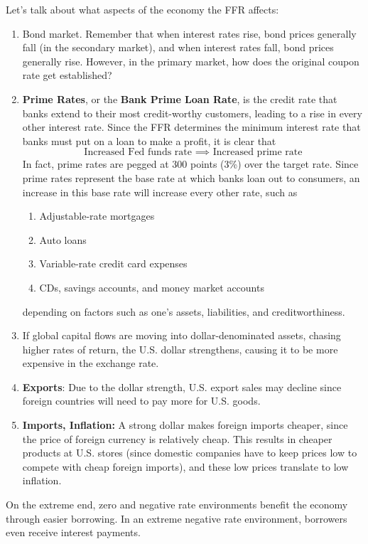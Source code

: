 \documentclass{article}
\begin{document}
      Let's talk about what aspects of the economy the FFR affects: 
      \begin{enumerate}
        \item Bond market. Remember that when interest rates rise, bond prices generally fall (in the secondary market), and when interest rates fall, bond prices generally rise. However, in the primary market, how does the original coupon rate get established? 
        
        \item \textbf{Prime Rates}, or the \textbf{Bank Prime Loan Rate}, is the credit rate that banks extend to their most credit-worthy customers, leading to a rise in every other interest rate. Since the FFR determines the minimum interest rate that banks must put on a loan to make a profit, it is clear that 
        \[\text{Increased Fed funds rate } \implies \text{ Increased prime rate}\]
        In fact, prime rates are pegged at 300 points (3\%) over the target rate. Since prime rates represent the base rate at which banks loan out to consumers, an increase in this base rate will increase every other rate, such as 
        \begin{enumerate}
            \item Adjustable-rate mortgages
            \item Auto loans
            \item Variable-rate credit card expenses
            \item CDs, savings accounts, and money market accounts
        \end{enumerate}
        depending on factors such as one's assets, liabilities, and creditworthiness. 
        \item If global capital flows are moving into dollar-denominated assets, chasing higher rates of return, the U.S. dollar strengthens, causing it to be more expensive in the exchange rate. 
        \item \textbf{Exports}: Due to the dollar strength, U.S. export sales may decline since foreign countries will need to pay more for U.S. goods. 
        \item \textbf{Imports, Inflation:} A strong dollar makes foreign imports cheaper, since the price of foreign currency is relatively cheap. This results in cheaper products at U.S. stores (since domestic companies have to keep prices low to compete with cheap foreign imports), and these low prices translate to low inflation. 
      \end{enumerate}
      On the extreme end, zero and negative rate environments benefit the economy through easier borrowing. In an extreme negative rate environment, borrowers even receive interest payments. 
\end{document}
